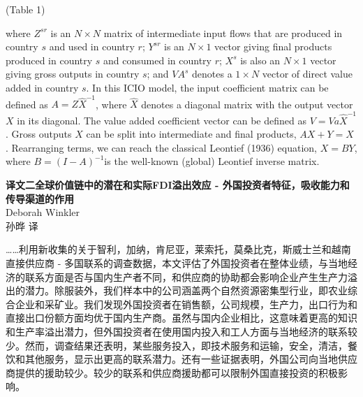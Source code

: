 \documentclass[12pt]{ctexart}
\newcommand{\htjc}{\CJKfamily{htj}}
\begin{document}
\begin{appendix}
\begin{center}
(Table 1)
\end{center}

where $Z^{sr}$ is an $N×N$ matrix of intermediate input flows that are produced in country $s$ and used in country $r$; $Y^{sr}$ is an $N×1$ vector giving final products produced in country $s$ and consumed in country $r$; $X^s$ is also an $N×1$ vector giving gross outputs in country $s$; and $VA^s$ denotes a $1×N$ vector of direct value added in country $s$. In this ICIO model, the input coefficient matrix can be defined as $A = Z\hat{X}^{-1}$, where $\hat{X}$ denotes a diagonal matrix with the output vector $X$ in its diagonal. The value added coefficient vector can be defined as $V = Va\hat{X}^{-1}$
. Gross outputs $X$ can be split into intermediate and final products, $AX + Y = X$
. Rearranging terms, we can reach the classical Leontief (1936) equation, $X = BY$,
where $B = (I-A)^{-1}$is the well-known (global) Leontief inverse matrix.
\newpage
\begin{center}
\vspace{3ex}
\textbf{\htjc 译文二}\quad\textbf{\htjc 全球价值链中的潜在和实际FDI溢出效应 - 外国投资者特征，吸收能力和传导渠道的作用}\\
\vspace{1.5ex}
Deborah Winkler\\
\vspace{1.5ex}
孙晔 \quad 译\\
\vspace{1.5ex}
\end{center}
……利用新收集的关于智利，加纳，肯尼亚，莱索托，莫桑比克，斯威士兰和越南直接供应商 - 多国联系的调查数据，本文评估了外国投资者在整体业绩，与当地经济的联系方面是否与国内生产者不同，和供应商的协助都会影响企业产生生产力溢出的潜力。除服装外，我们样本中的公司涵盖两个自然资源密集型行业，即农业综合企业和采矿业。我们发现外国投资者在销售额，公司规模，生产力，出口行为和直接出口份额方面均优于国内生产商。虽然与国内企业相比，这意味着更高的知识和生产率溢出潜力，但外国投资者在使用国内投入和工人方面与当地经济的联系较少。然而，调查结果还表明，某些服务投入，即技术服务和运输，安全，清洁，餐饮和其他服务，显示出更高的联系潜力。还有一些证据表明，外国公司向当地供应商提供的援助较少。较少的联系和供应商援助都可以限制外国直接投资的积极影响。

\newpage

\end{appendix}
\end{document}
